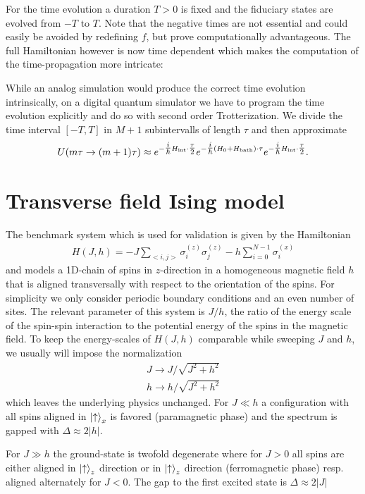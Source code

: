 \documentclass[11pt,a4paper]{article}
\begin{document}
For the time evolution a duration $T>0$ is fixed and the fiduciary states are evolved from $-T$ to $T$. Note that the negative times are not essential and could easily be avoided by redefining $f$, but prove computationally advantageous. The full Hamiltonian however is now time dependent which makes the computation of the time-propagation more intricate:


While an analog simulation would produce the correct time evolution intrinsically, on a digital quantum simulator we have to program the time evolution explicitly and do so with second order Trotterization. We divide the time interval $[-T, T]$ in $M+1$ subintervalls of length $\tau$ and 
then approximate 
\begin{align}\label{trotterization}
U(m\tau\rightarrow (m+1)\tau)\approx e^{-\tfrac{i}{\hbar}H_{\rm int}\cdot\tfrac{\tau}{2}} e^{-\tfrac{i}{\hbar}(H_0 + H_{\rm bath})\cdot\tau}e^{-\tfrac{i}{\hbar}H_{\rm int}\cdot\tfrac{\tau}{2}}.
\end{align}

\section{Transverse field Ising model}
The benchmark system which is used for validation is given by the Hamiltonian
\begin{align*}
    H(J,h) = -J\sum_{<i,j>} \sigma^{(z)}_{i}\sigma^{(z)}_{j} - h\sum_{i=0}^{N-1} \sigma^{(x)}_i 
\end{align*} 
and models a 1D-chain of spins in $z$-direction in a homogeneous magnetic field $h$ that is aligned transversally with respect to the orientation of the spins. For simplicity we only consider periodic boundary conditions and an even number of sites. The relevant parameter of this system is $J/h$, the ratio of the energy scale of the spin-spin interaction to the potential energy of the spins in the magnetic field. To keep the energy-scales of $H(J,h)$ comparable while sweeping $J$ and $h$, we usually will impose the normalization
\begin{align*}
    J \to J/\sqrt{J^2+h^2}\\
    h \to h/\sqrt{J^2+h^2}
\end{align*} which leaves the underlying physics unchanged. For $J\ll h$ a configuration with all spins aligned in $\ket{\uparrow}_x$ is favored (paramagnetic phase) and the spectrum is gapped with $\Delta \approx 2|h|$. 

For $J\gg h$ the ground-state is twofold degenerate where for $J>0$ all spins are either aligned in $\ket{\uparrow}_z$ direction or in $\ket{\uparrow}_z$ direction (ferromagnetic phase) resp. aligned alternately for $J<0$. The gap to the first excited state is $\Delta \approx 2 |J|$
\end{document}
